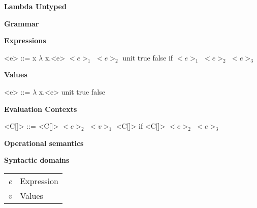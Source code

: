 \documentclass[11pt,oneside]{book}
\begin{document}
\frontmatter

\mainmatter

\pagebreak

\begin{center}
    {
        \bf
        \huge
        Lambda Untyped
    }
\end{center}

\begin{center}
{
    \bf
    \huge
    Grammar
}
\end{center}


\setlength{\grammarindent}{10em} %

\setlength{\grammarparsep}{5pt} %

\textbf{Expressions}

\begin{grammar}

    <e> ::=  x
        \alt $\lambda$ x.<e>
        \alt $<e>_1$ $<e>_2$
        \alt unit
        \alt true
        \alt false
        \alt if $<e>_1$ $<e>_2$ $<e>_3$

\end{grammar}

\textbf{Values}

\begin{grammar}

    <e> ::=  $\lambda$ x.<e>
        \alt unit
        \alt true
        \alt false

\end{grammar}

\textbf{Evaluation Contexts}

\begin{grammar}

    <C[\textbullet]> ::=  \textbullet
                     \alt <C[\textbullet]> $<e>_2$
                     \alt $<v>_1$ <C[\textbullet]>
                     \alt if <C[\textbullet]> $<e>_2$ $<e>_3$
\end{grammar}

\hfill
\begin{center}
{
    \bf
    \huge
    Operational semantics
}
\end{center}

\textbf{Syntactic domains}

\begin{tabular}{ l l }
    \textit{e} & Expression \\
    \textit{v} & Values \\
\end{tabular}
\end{document}
